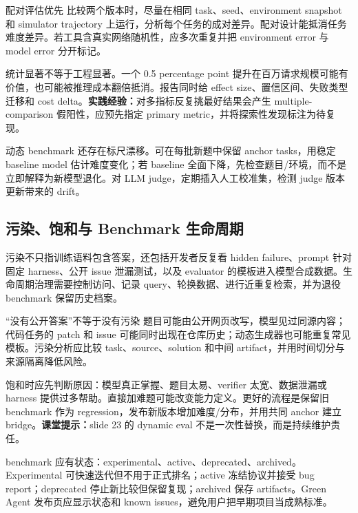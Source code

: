 \begin{knowledgebox}{配对评估优先}
比较两个版本时，尽量在相同 task、seed、environment snapshot 和 simulator trajectory 上运行，分析每个任务的成对差异。配对设计能抵消任务难度差异。若工具含真实网络随机性，应多次重复并把 environment error 与 model error 分开标记。
\end{knowledgebox}

统计显著不等于工程显著。一个 0.5 percentage point 提升在百万请求规模可能有价值，也可能被推理成本翻倍抵消。报告同时给 effect size、置信区间、失败类型迁移和 cost delta。\textbf{实践经验：}对多指标反复挑最好结果会产生 multiple-comparison 假阳性，应预先指定 primary metric，并将探索性发现标注为待复现。

动态 benchmark 还存在标尺漂移。可在每批新题中保留 anchor tasks，用稳定 baseline model 估计难度变化；若 baseline 全面下降，先检查题目/环境，而不是立即解释为新模型退化。对 LLM judge，定期插入人工校准集，检测 judge 版本更新带来的 drift。

\subsection{污染、饱和与 Benchmark 生命周期}

污染不只指训练语料包含答案，还包括开发者反复看 hidden failure、prompt 针对固定 harness、公开 issue 泄漏测试，以及 evaluator 的模板进入模型合成数据。生命周期治理需要控制访问、记录 query、轮换数据、进行近重复检索，并为退役 benchmark 保留历史档案。

\begin{warningbox}{“没有公开答案”不等于没有污染}
题目可能由公开网页改写，模型见过同源内容；代码任务的 patch 和 issue 可能同时出现在仓库历史；动态生成器也可能重复常见模板。污染分析应比较 task、source、solution 和中间 artifact，并用时间切分与来源隔离降低风险。
\end{warningbox}

饱和时应先判断原因：模型真正掌握、题目太易、verifier 太宽、数据泄漏或 harness 提供过多帮助。直接加难题可能改变能力定义。更好的流程是保留旧 benchmark 作为 regression，发布新版本增加难度/分布，并用共同 anchor 建立 bridge。\textbf{课堂提示：}slide 23 的 dynamic eval 不是一次性替换，而是持续维护责任。

benchmark 应有状态：experimental、active、deprecated、archived。Experimental 可快速迭代但不用于正式排名；active 冻结协议并接受 bug report；deprecated 停止新比较但保留复现；archived 保存 artifacts。Green Agent 发布页应显示状态和 known issues，避免用户把早期项目当成熟标准。

